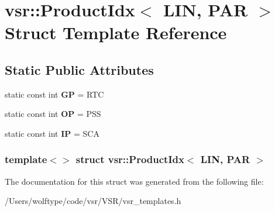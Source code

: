 \hypertarget{structvsr_1_1_product_idx_3_01_l_i_n_00_01_p_a_r_01_4}{\section{vsr\-:\-:Product\-Idx$<$ L\-I\-N, P\-A\-R $>$ Struct Template Reference}
\label{structvsr_1_1_product_idx_3_01_l_i_n_00_01_p_a_r_01_4}
}
\subsection*{Static Public Attributes}
\begin{DoxyCompactItemize}
\item 
\hypertarget{structvsr_1_1_product_idx_3_01_l_i_n_00_01_p_a_r_01_4_aebd556d42b8bf0d03cde87c89c849023}{static const int {\bfseries G\-P} = R\-T\-C}\label{structvsr_1_1_product_idx_3_01_l_i_n_00_01_p_a_r_01_4_aebd556d42b8bf0d03cde87c89c849023}

\item 
\hypertarget{structvsr_1_1_product_idx_3_01_l_i_n_00_01_p_a_r_01_4_a935ca9d307ac74f2351e9cd04eed2ce2}{static const int {\bfseries O\-P} = P\-S\-S}\label{structvsr_1_1_product_idx_3_01_l_i_n_00_01_p_a_r_01_4_a935ca9d307ac74f2351e9cd04eed2ce2}

\item 
\hypertarget{structvsr_1_1_product_idx_3_01_l_i_n_00_01_p_a_r_01_4_aa5f3cc014ed8847e36cdda8fb0104383}{static const int {\bfseries I\-P} = S\-C\-A}\label{structvsr_1_1_product_idx_3_01_l_i_n_00_01_p_a_r_01_4_aa5f3cc014ed8847e36cdda8fb0104383}

\end{DoxyCompactItemize}
\subsubsection*{template$<$$>$ struct vsr\-::\-Product\-Idx$<$ L\-I\-N, P\-A\-R $>$}



The documentation for this struct was generated from the following file\-:\begin{DoxyCompactItemize}
\item 
/\-Users/wolftype/code/vsr/\-V\-S\-R/vsr\-\_\-templates.\-h\end{DoxyCompactItemize}
